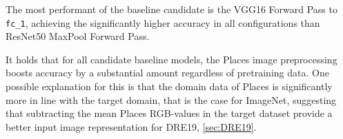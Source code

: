 The most performant of the baseline candidate is the VGG16 Forward Pass to \texttt{fc\_1}, achieving the significantly higher accuracy in all configurations than ResNet50 MaxPool Forward Pass. 

\begin{table}[H]
    \centering
\end{table}

It holds that for all candidate baseline models, the Places image preprocessing boosts accuracy by a substantial amount regardless of pretraining data.
One possible explanation for this is that the domain data of Places is significantly more in line with the target domain, that is the case for ImageNet, suggesting that subtracting the mean Places RGB-values in the target dataset provide a better input image representation for DRE19, \ref{sec:DRE19}.
